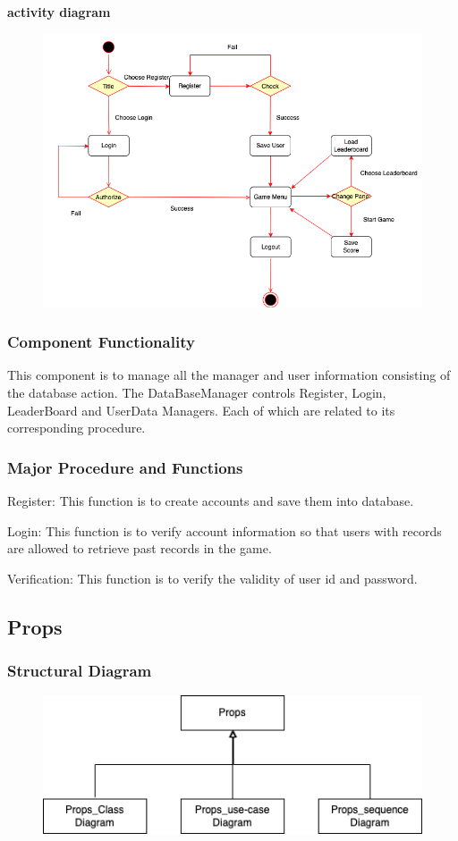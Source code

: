 \documentclass[11pt]{article}
\begin{document}
\textbf{activity diagram}\\
\begin{figure}[H]
    \centering
    \includegraphics*[scale=0.4]{Database_Activity.png}
\end{figure}
\subsubsection{Component Functionality}
This component is to manage all the manager and user information consisting of the database action. The DataBaseManager controls Register, Login, LeaderBoard and UserData Managers. Each of which are related to its corresponding procedure.
\subsubsection{Major Procedure and Functions}
Register: This function is to create accounts and save them into database.

Login: This function is to verify account information so that users with records are allowed to retrieve past records in the game.

Verification: This function is to verify the validity of user id and password.

\subsection{Props}
\subsubsection{Structural Diagram}
\begin{figure}[H]
    \centering
    \includegraphics*[scale=0.4]{Props_struct.png}
\end{figure}
\end{document}
